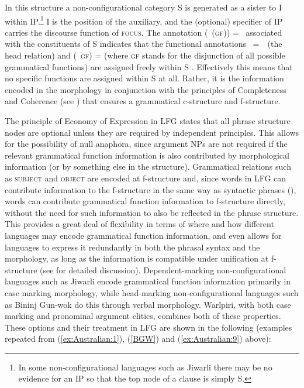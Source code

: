 \documentclass[output=paper,hidelinks]{langscibook}
\begin{document}
In this structure a non-configurational category S is generated as a sister to I within IP.\footnote{In some non-configurational languages such as Jiwarli \citep{AustBres96} there may be no evidence for an IP so that the top node of a clause is simply S.}  I is the position of the auxiliary, and the (optional) specifier of IP carries the discourse function of \textsc{focus}.  The annotation (\UP\ (\textsc{gf})) = \DOWN\ associated with the constituents of S indicates that the functional annotations \mbox{\UP\ = \DOWN}\ (the head relation) and (\UP\ \textsc{gf}) = \DOWN (where \textsc{gf} stands for the disjunction of all possible grammatical functions) are assigned freely within S \citep{Simpson1991,AustBres96}.  Effectively this means that no specific functions are assigned within S at all.  Rather, it is the information encoded in the morphology in conjunction with the principles of Completeness and Coherence (see ) that ensures a grammatical c-structure and f-structure.

The principle of Economy of Expression in LFG \citep{bresnan2001lexical} states that all phrase structure nodes are optional unless they are required by independent principles. This allows for the possibility of null anaphora, since argument NPs are not required if the relevant grammatical function information is also contributed by morphological information (or by something else in the structure). Grammatical relations such as \textsc{subject} and \textsc{object} are encoded at f-structure and, since words in LFG can contribute information to the f-structure in the same way as syntactic phrases (), words can contribute grammatical function information to f-structure directly, without the need for such information to also be reflected in the phrase structure. This provides a great deal of flexibility in terms of where and how different languages may encode grammatical function information, and even allows for languages to express it redundantly in both the phrasal syntax and the morphology, as long as the information is compatible under unification at f-structure (see \citet[Chapter 3]{nordlinger1998constructive} for detailed discussion). Dependent-marking non-configurational languages such as Jiwarli \citep{Austin01} encode grammatical function information primarily in case marking morphology, while head-marking non-configurational languages such as Bininj Gun-wok do this through verbal morphology.  Warlpiri, with both case marking and pronominal argument clitics, combines both of these properties. These options and their treatment in LFG are shown in the following (examples repeated from (\ref{ex:Australian:1}), (\ref{BGW}) and (\ref{ex:Australian:9}) above):
\end{document}
